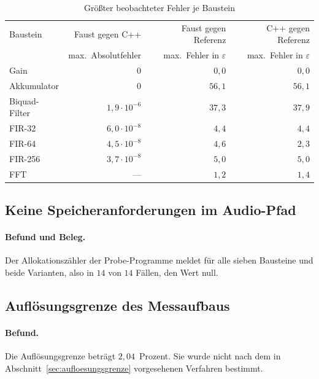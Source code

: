 \begin{table}[htb]
	\centering
	\small
	\caption{Größter beobachteter Fehler je Baustein}
	\label{tab:eval-genauigkeit}
	\begin{tabular}{lrrr}
		\toprule
		Baustein & Faust gegen C++ & Faust gegen Referenz & C++ gegen Referenz \\
		& max.\ Absolutfehler & max.\ Fehler in $\varepsilon$ & max.\ Fehler in $\varepsilon$ \\
		\midrule
		Gain          & $0$                  & $0{,}0$  & $0{,}0$  \\
		Akkumulator   & $0$                  & $56{,}1$ & $56{,}1$ \\
		Biquad-Filter & $1{,}9\cdot10^{-6}$  & $37{,}3$ & $37{,}9$ \\
		FIR-32        & $6{,}0\cdot10^{-8}$  & $4{,}4$  & $4{,}4$  \\
		FIR-64        & $4{,}5\cdot10^{-8}$  & $4{,}6$  & $2{,}3$  \\
		FIR-256       & $3{,}7\cdot10^{-8}$  & $5{,}0$  & $5{,}0$  \\
		FFT           & ---                  & $1{,}2$  & $1{,}4$  \\
		\bottomrule
	\end{tabular}
\end{table}

\subsection{Keine Speicheranforderungen im Audio-Pfad}

\paragraph{Befund und Beleg.}
Der Allokationszähler der Probe-Programme meldet für alle sieben Bausteine und beide Varianten, also in $14$ von $14$ Fällen, den Wert null.

\subsection{Auflösungsgrenze des Messaufbaus}
\label{subsec:eval-grenze}

\paragraph{Befund.}
Die Auflösungsgrenze beträgt $2{,}04$~Prozent. Sie wurde nicht nach dem in Abschnitt~\ref{sec:aufloesungsgrenze} vorgesehenen Verfahren bestimmt.

